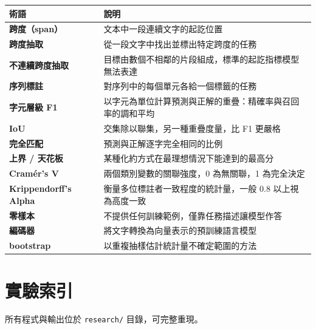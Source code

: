 \documentclass[11pt,a4paper]{ctexart}
\begin{document}
\begin{longtable}{@{}p{4.4cm}p{10.1cm}@{}}
\toprule
術語 & 說明 \\
\midrule
\endhead
\textbf{跨度（span）} & 文本中一段連續文字的起訖位置 \\
\textbf{跨度抽取} & 從一段文字中找出並標出特定跨度的任務 \\
\textbf{不連續跨度抽取} & 目標由數個不相鄰的片段組成，標準的起訖指標模型無法表達 \\
\textbf{序列標註} & 對序列中的每個單元各給一個標籤的任務 \\
\textbf{字元層級 F1} & 以字元為單位計算預測與正解的重疊：精確率與召回率的調和平均 \\
\textbf{IoU} & 交集除以聯集，另一種重疊度量，比 F1 更嚴格 \\
\textbf{完全匹配} & 預測與正解逐字完全相同的比例 \\
\textbf{上界 / 天花板} & 某種化約方式在最理想情況下能達到的最高分 \\
\textbf{Cramér's V} & 兩個類別變數的關聯強度，0 為無關聯，1 為完全決定 \\
\textbf{Krippendorff's Alpha} & 衡量多位標註者一致程度的統計量，一般 0.8 以上視為高度一致 \\
\textbf{零樣本} & 不提供任何訓練範例，僅靠任務描述讓模型作答 \\
\textbf{編碼器} & 將文字轉換為向量表示的預訓練語言模型 \\
\textbf{bootstrap} & 以重複抽樣估計統計量不確定範圍的方法 \\
\bottomrule
\end{longtable}

\section{實驗索引}

所有程式與輸出位於 \texttt{research/} 目錄，可完整重現。
\end{document}
